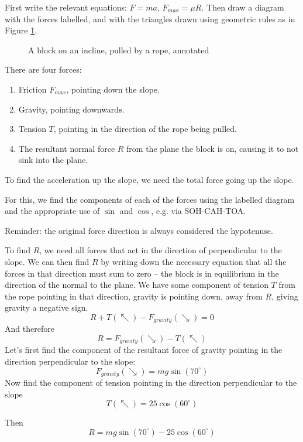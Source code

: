 \begin{solution}
    
First write the relevant equations: $F = ma$, $F_{max} = \mu R$. 
Then draw a diagram with the forces labelled, and with the triangles drawn using geometric rules 
as in Figure \ref{fig:block-incline-rope-annotated}.
\begin{figure}[H]
    \centering
    \caption{A block on an incline, pulled by a rope, annotated}
    \label{fig:block-incline-rope-annotated}
\end{figure}

There are four forces:
\begin{enumerate}
    \item Friction $F_{max}$, pointing down the slope.
    \item Gravity, pointing downwards.
    \item Tension $T$, pointing in the direction of the rope being pulled. 
    \item The resultant normal force $R$ from the plane the block is on, causing it to not sink into the plane.
\end{enumerate}

To find the acceleration up the slope, we need the total force going up the slope.

For this, we find the components of each of the forces using the labelled diagram and the appropriate use of $\sin$ and $\cos$, 
e.g. via SOH-CAH-TOA.

Reminder: the original force direction is always considered the hypotenuse.

To find $R$, we need all forces that act in the direction of perpendicular to the slope. We can then find $R$ by writing 
down the necessary equation that all the forces in that direction must sum to zero -- the block is in equilibrium in the direction 
of the normal to the plane. We have some component of tension $T$ from the rope 
pointing in that direction, gravity is pointing down, away from $R$, 
giving gravity a negative sign.
\[ R + T(\nwarrow) - F_{gravity}(\searrow)  = 0 \]
And therefore
\[ R = F_{gravity}(\searrow) - T(\nwarrow)\]
Let's first find the component of the resultant force of gravity pointing in the direction perpendicular to the slope:
\[ F_{gravity}(\searrow) = mg \sin (70^\circ)\]
Now find the component of tension pointing in the direction perpendicular to the slope 
\[ T(\nwarrow) = 25 \cos(60^\circ)\]

Then 
\[R = mg \sin (70^\circ)  - 25 \cos(60^\circ) \]


\end{solution}
